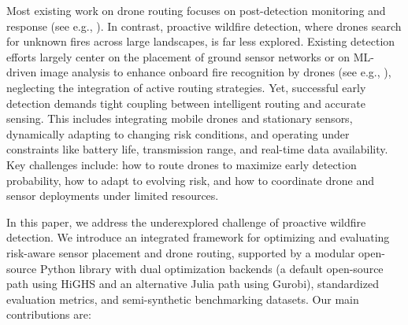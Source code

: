 \documentclass{article}
\begin{document}
Most existing work on drone routing focuses on post-detection monitoring and response 
(see e.g., \cite{FirefightingPSO, WildfireMonitoringBailonruiz22}). 
In contrast, proactive wildfire detection, where drones search for unknown fires across large landscapes, is far less explored. Existing detection efforts largely center on the placement of ground sensor networks \cite{BAO2015100, f12040453, 10756651, 9068226} or on ML-driven image analysis to enhance onboard fire recognition by drones (see e.g., \cite{RAMADAN2024101248, WildfireDetectionBouguettaya}), neglecting the integration of active routing strategies. Yet, successful early detection demands tight coupling between intelligent routing and accurate sensing. This includes integrating mobile drones and stationary sensors, dynamically adapting to changing risk conditions, and operating under constraints like battery life, transmission range, and real-time data availability. Key challenges include: how to route drones to maximize early detection probability, how to adapt to evolving risk, and how to coordinate drone and sensor deployments under limited resources.

In this paper, we address the underexplored challenge of proactive wildfire detection. We introduce an integrated framework for optimizing and evaluating risk-aware sensor placement and drone routing, supported by a modular open-source Python library with dual optimization backends (a default open-source path using HiGHS and an alternative Julia path using Gurobi), standardized evaluation metrics, and semi-synthetic benchmarking datasets. Our main contributions are:

\end{document}
